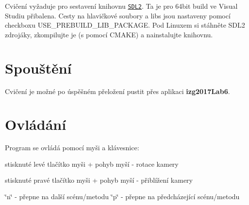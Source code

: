 Cvičení vyžaduje pro sestavení knihovnu \href{https://www.libsdl.org/download-2.0.php}{\tt S\-D\-L2}. Ta je pro 64bit build ve Visual Studiu přibalena. Cesty na hlavičkové soubory a libs jsou nastaveny pomocí checkboxu U\-S\-E\-\_\-\-P\-R\-E\-B\-U\-I\-L\-D\-\_\-\-L\-I\-B\-\_\-\-P\-A\-C\-K\-A\-G\-E. Pod Linuxem si stáhněte S\-D\-L2 zdrojáky, zkompilujte je (s pomocí C\-M\-A\-K\-E) a nainstalujte knihovnu.\hypertarget{index_spousteni}{}\section{Spouštění}\label{index_spousteni}
Cvičení je možné po úspěšném přeložení pustit přes aplikaci {\bfseries izg2017\-Lab6}.\hypertarget{index_ovladani}{}\section{Ovládání}\label{index_ovladani}
Program se ovládá pomocí myši a klávesnice\-:
\begin{DoxyItemize}
\item stisknuté levé tlačítko myši + pohyb myší -\/ rotace kamery
\item stisknuté pravé tlačítko myši + pohyb myší -\/ přiblížení kamery
\item \char`\"{}n\char`\"{} -\/ přepne na další scénu/metodu \char`\"{}p\char`\"{} -\/ přepne na předcházející scénu/metodu 
\end{DoxyItemize}